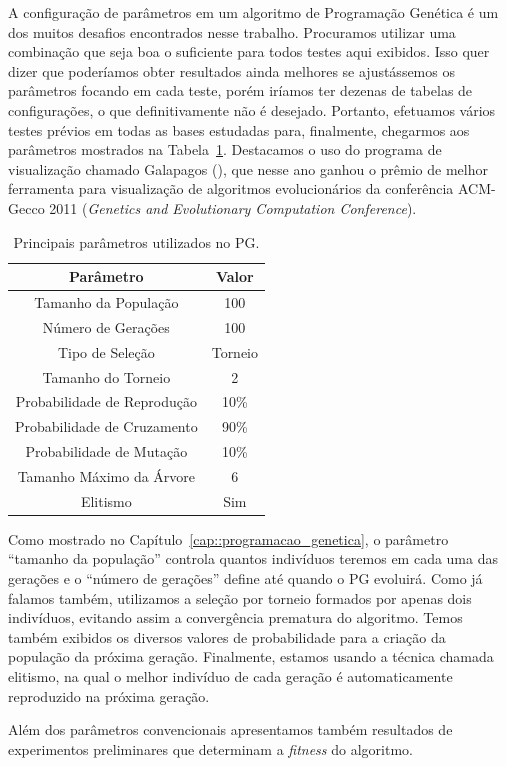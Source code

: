 A configuração de parâmetros em um algoritmo de Programação Genética é um dos muitos desafios encontrados nesse trabalho. Procuramos utilizar uma combinação que seja boa o suficiente para todos testes aqui exibidos. Isso quer dizer que poderíamos obter resultados ainda melhores se ajustássemos os parâmetros focando em cada teste, porém iríamos ter dezenas de tabelas de configurações, o que definitivamente não é desejado. Portanto, efetuamos vários testes prévios em todas as bases estudadas para, finalmente, chegarmos aos parâmetros mostrados na Tabela~\ref{tab::parametros}.   
Destacamos o uso do programa de visualização chamado Galapagos (\cite{galapagos}), que nesse ano ganhou o prêmio de melhor ferramenta para visualização de algoritmos evolucionários da conferência ACM-Gecco 2011 (\textit{Genetics and Evolutionary Computation Conference}). 

\begin{table}[!h]
\centering
\caption{Principais parâmetros utilizados no \textsc{PG}.}
\label{tab::parametros}
\begin{tabular}{|c||c|}
\toprule 
\textbf{Parâmetro} & \textbf{Valor}\tabularnewline
\midrule
\hline
Tamanho da População & 100\tabularnewline
\hline 
Número de Gerações & 100\tabularnewline
\hline 
Tipo de Seleção & Torneio\tabularnewline
\hline 
Tamanho do Torneio & 2\tabularnewline
\hline 
Probabilidade de Reprodução & 10\%\tabularnewline
\hline 
Probabilidade de Cruzamento & 90\%\tabularnewline
\hline 
Probabilidade de Mutação & 10\%\tabularnewline
\hline 
Tamanho Máximo da Árvore & 6\tabularnewline
\hline 
Elitismo & Sim\tabularnewline
\bottomrule
\end{tabular}
\end{table}

Como mostrado no Capítulo~\ref{cap::programacao_genetica}, o parâmetro ``tamanho da população'' controla quantos indivíduos teremos em cada uma das gerações e o ``número de gerações'' define até quando o \textsc{PG} evoluirá. Como já falamos também, utilizamos a seleção por torneio formados por apenas dois indivíduos, evitando assim a convergência prematura do algoritmo. 
Temos também exibidos os diversos valores de probabilidade para a criação da população da próxima geração. Finalmente, estamos usando a técnica chamada elitismo, na qual o melhor indivíduo de cada geração é automaticamente reproduzido na próxima geração.

Além dos parâmetros convencionais apresentamos também resultados de experimentos preliminares que determinam a \textit{fitness} do algoritmo. 


